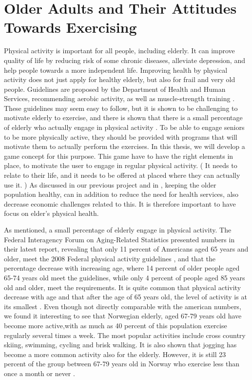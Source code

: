 \chapter{Older Adults and Their Attitudes Towards Exercising}

Physical activity is important for all people, including elderly. It can improve quality of life by reducing risk of some chronic diseases, alleviate depression, and help people towards a more independent life. Improving health by physical activity does not just apply for healthy elderly, but also for frail and very old people. Guidelines are proposed by the Department of Health and Human Services, recommending aerobic activity, as well as muscle-strength training \cite{olderamericans}. These guidelines  may seem easy to follow, but it is shown to be challenging to motivate elderly to exercise, and there is shown that there is a small percentage of elderly who actually engage in physical activity \cite{olderamericans}. To be able to engage seniors to be more physically active, they should be provided with programs that will motivate them to actually perform the exercises. In this thesis, we will develop a game concept for this purpose. This game have to have the right elements in place, to motivate the user to engage in regular physical activity. ( It needs to relate to their life, and it needs to be offered at placed where they can actually use it. ) As discussed in our previous project \cite{project} and in \cite{schutzer}, keeping the older population healthy, can in addition to reduce the need for health services, also decrease economic challenges related to this.  It is therefore important to have focus on elder's physical health. 

As mentioned, a small percentage of elderly engage in physical activity. The Federal Interagency Forum on Aging-Related Statistics \cite{olderamericans} presented numbers in their latest report, revealing that only 11 percent of Americans aged 65 years and older, meet the 2008 Federal physical activity guidelines \cite{guidelines}, and that the percentage decrease with increasing age, where 14 percent of older people aged 65-74 years old meet the guidelines, while only 4 percent of people aged 85 years old and older, meet the requirements.  It is quite common that physical activity decrease with age and that after the age of 65 years old, the level of activity is at its smallest \cite{schutzer}. Even though not directly comparable with the american numbers, we found it interesting to see that Norwegian elderly, aged  67-79 years old have become more active,with as much as 40 percent of this population exercise regularly several times a week. The most popular activities include cross country skiing, swimming, cycling and brisk walking. It is also shown that jogging has become a more common activity also for the elderly. However, it is still 23 percent of the group between 67-79 years old in Norway who exercise less than once a month or never \cite{statisticsnorway}.

